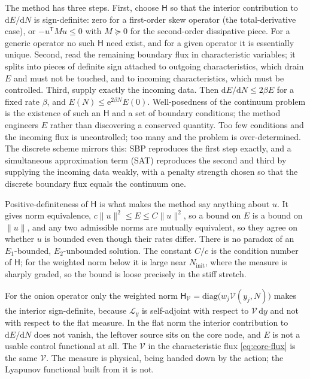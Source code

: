 \documentclass[a4paper,11pt]{article}
\newcommand{\transpose}{\mathsf{T}}
\renewcommand{\leq}{\leqslant}
\renewcommand{\d}{\mathrm{d}}
\newcommand{\e}[1]{\mathrm{e}^{{#1}}}
\newcommand{\Ny}{N}                          %
\newcommand{\Ninit}{N_{\mathrm{init}}}       %
\newcommand{\yco}{y}                         %
\newcommand{\Lop}{\mathcal{L}_\yco}          %
\newcommand{\volel}{\mathcal{V}}             %
\newcommand{\Hen}{E}                          %
\newcommand{\Hnorm}{\mathsf{H}}               %
\begin{document}
The method has three steps. First, choose $\Hnorm$ so that the interior
contribution to $\d\Hen/\d\Ny$ is sign-definite: zero for a first-order
skew operator (the total-derivative case), or $-u^{\transpose}Mu\leq0$ with
$M\succeq0$ for the second-order dissipative piece. For a generic operator
no such $\Hnorm$ need exist, and for a given operator it is essentially
unique. Second, read the remaining boundary flux in characteristic
variables; it splits into pieces of definite sign attached to outgoing
characteristics, which drain $\Hen$ and must not be touched, and to
incoming characteristics, which must be controlled. Third, supply exactly
the incoming data. Then $\d\Hen/\d\Ny\leq2\beta\Hen$ for a fixed rate
$\beta$, and $\Hen(\Ny)\leq\e{2\beta\Ny}\Hen(0)$. Well-posedness of the
continuum problem is the existence of such an $\Hnorm$ and a set of
boundary conditions; the method engineers $\Hen$ rather than discovering
a conserved quantity. Too few conditions and the incoming flux is
uncontrolled; too many and the problem is over-determined. The discrete
scheme mirrors this: SBP reproduces the first step exactly, and a
simultaneous approximation term (SAT) reproduces the second and third by
supplying the incoming data weakly, with a penalty strength chosen so
that the discrete boundary flux equals the continuum one.

Positive-definiteness of $\Hnorm$ is what makes the method say anything
about $u$. It gives norm equivalence, $c\|u\|^2\leq\Hen\leq C\|u\|^2$, so a
bound on $\Hen$ is a bound on $\|u\|$, and any two admissible norms are
mutually equivalent, so they agree on whether $u$ is bounded even though
their rates differ. There is no paradox of an $\Hen_1$-bounded,
$\Hen_2$-unbounded solution. The constant $C/c$ is the condition number of
$\Hnorm$; for the weighted norm below it is large near $\Ninit$, where the
measure is sharply graded, so the bound is loose precisely in the stiff
stretch.

For the onion operator only the weighted norm
$\Hnorm_\volel=\mathrm{diag}\big(w_j\volel(\yco_j,\Ny)\big)$ makes the
interior sign-definite, because $\Lop$ is self-adjoint with respect to
$\volel\,\d\yco$ and not with respect to the flat measure. In the flat
norm the interior contribution to $\d\Hen/\d\Ny$ does not vanish, the
leftover source sits on the core node, and $\Hen$ is not a usable control
functional at all. The $\volel$ in the characteristic flux
\eqref{eq:core-flux} is the same $\volel$. The measure is physical, being
handed down by the action; the Lyapunov functional built from it is not.
\end{document}
